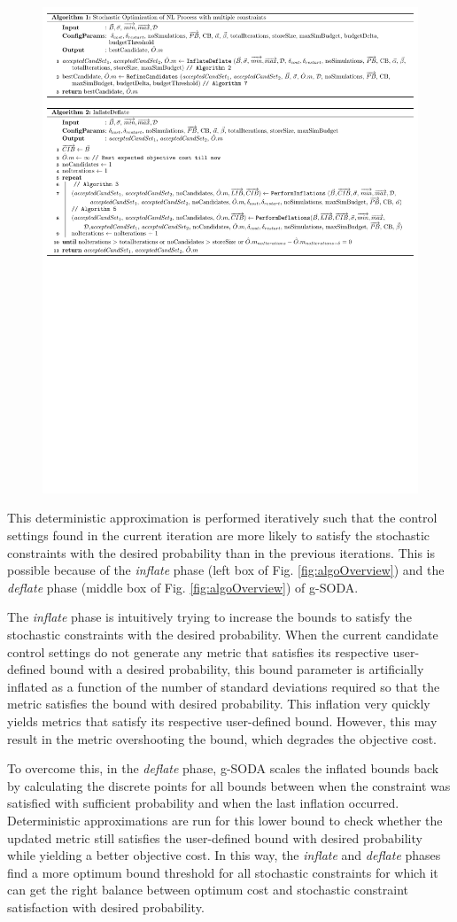 \documentclass[a4paper, 12pt]{article} %
\begin{document}
\begin{figure}
	\begin{center}
	\includegraphics[width=.7\textwidth]{pseudoCode/Algo1-2.pdf}
	\end{center}

\end{figure}
This deterministic approximation is performed iteratively such that the control settings found in the current iteration are more likely to satisfy the stochastic constraints with the desired probability than in the previous iterations. This is possible because of the \textit{inflate} phase (left box of Fig. \ref{fig:algoOverview}) and the \textit{deflate} phase (middle box of Fig. \ref{fig:algoOverview}) of g-SODA. 

The \textit{inflate} phase is intuitively trying to increase the bounds to satisfy the stochastic constraints with the desired probability. 
When the current candidate control settings do not generate any metric that satisfies its respective user-defined bound with a desired probability, this bound parameter is artificially inflated as a function of the number of standard deviations required so that the metric satisfies the bound with desired probability.
This inflation very quickly yields metrics that satisfy its respective user-defined bound. However, this may result in the metric overshooting the bound, which degrades the objective cost. 

To overcome this, in the \textit{deflate} phase, g-SODA scales the inflated bounds back by calculating the discrete points for all bounds between when the constraint was satisfied with sufficient probability and when the last inflation occurred.
 Deterministic approximations are run for this lower bound to check whether the updated metric still satisfies the user-defined bound with desired probability while yielding a better objective cost. 
 In this way, the \textit{inflate} and \textit{deflate} phases find a more optimum bound threshold for all stochastic constraints for which it can get the right balance between optimum cost and stochastic constraint satisfaction with desired probability.
\end{document}
